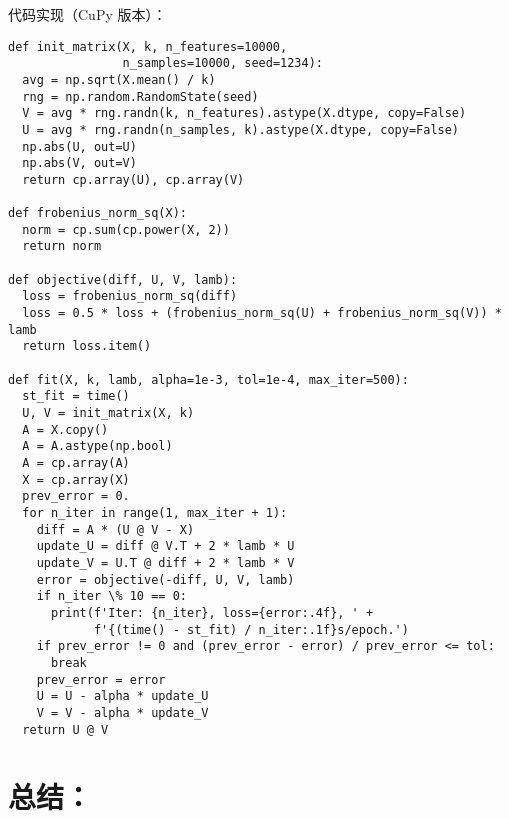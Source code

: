 \documentclass[degree=project, degree-type=project]{thuthesis}
\begin{document}
代码实现（CuPy 版本）：

  \begin{verbatim}
def init_matrix(X, k, n_features=10000,
                n_samples=10000, seed=1234):
  avg = np.sqrt(X.mean() / k)
  rng = np.random.RandomState(seed)
  V = avg * rng.randn(k, n_features).astype(X.dtype, copy=False)
  U = avg * rng.randn(n_samples, k).astype(X.dtype, copy=False)
  np.abs(U, out=U)
  np.abs(V, out=V)
  return cp.array(U), cp.array(V)

def frobenius_norm_sq(X):
  norm = cp.sum(cp.power(X, 2))
  return norm

def objective(diff, U, V, lamb):
  loss = frobenius_norm_sq(diff)
  loss = 0.5 * loss + (frobenius_norm_sq(U) + frobenius_norm_sq(V)) * lamb
  return loss.item()

def fit(X, k, lamb, alpha=1e-3, tol=1e-4, max_iter=500):
  st_fit = time()
  U, V = init_matrix(X, k)
  A = X.copy()
  A = A.astype(np.bool)
  A = cp.array(A)
  X = cp.array(X)
  prev_error = 0.
  for n_iter in range(1, max_iter + 1):
    diff = A * (U @ V - X)
    update_U = diff @ V.T + 2 * lamb * U
    update_V = U.T @ diff + 2 * lamb * V
    error = objective(-diff, U, V, lamb)
    if n_iter \% 10 == 0:
      print(f'Iter: {n_iter}, loss={error:.4f}, ' +
            f'{(time() - st_fit) / n_iter:.1f}s/epoch.')
    if prev_error != 0 and (prev_error - error) / prev_error <= tol:
      break
    prev_error = error
    U = U - alpha * update_U
    V = V - alpha * update_V
  return U @ V
  \end{verbatim}


\chapter{总结：}

\backmatter


\appendix
\end{document}

